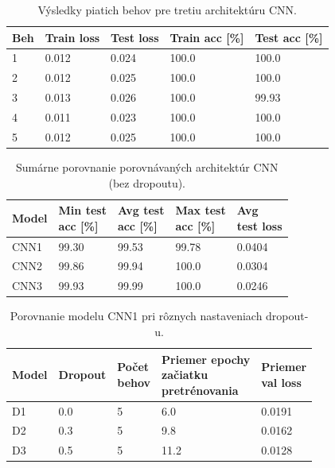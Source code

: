 \documentclass[12pt, a4paper]{article}
\begin{document}
\begin{table}[htbp]
\centering
\caption{Výsledky piatich behov pre tretiu architektúru CNN.}
\label{tab:cnn3_runs}
\begin{tabular}{lllll}
\toprule
Beh & Train loss & Test loss & Train acc [\%] & Test acc [\%] \\
\midrule
1 & 0.012 & 0.024 & 100.0 & 100.0 \\
2 & 0.012 & 0.025 & 100.0 & 100.0 \\
3 & 0.013 & 0.026 & 100.0 & 99.93 \\
4 & 0.011 & 0.023 & 100.0 & 100.0 \\
5 & 0.012 & 0.025 & 100.0 & 100.0 \\
\bottomrule
\end{tabular}
\end{table}

\begin{table}[htbp]
\centering
\caption{Sumárne porovnanie porovnávaných architektúr CNN (bez dropoutu).}
\label{tab:cnn_summary}
\begin{tabular}{lllll}
\toprule
Model & \shortstack{Min test\\acc [\%]} & \shortstack{Avg test\\acc [\%]} & \shortstack{Max test\\acc [\%]} & \shortstack{Avg\\test loss} \\
\midrule
CNN1 & 99.30 & 99.53 & 99.78 & 0.0404 \\
CNN2 & 99.86 & 99.94 & 100.0 & 0.0304 \\
CNN3 & 99.93 & 99.99 & 100.0 & 0.0246 \\
\bottomrule
\end{tabular}
\end{table}

\begin{table}[htbp]
\centering
\caption{Porovnanie modelu CNN1 pri rôznych nastaveniach dropout-u.}
\label{tab:dropout_overfitting}
\begin{tabular}{lllll}
\toprule
Model & Dropout & \shortstack{Počet\\behov} & \shortstack{Priemer epochy\\začiatku\\pretrénovania} & \shortstack{Priemer\\val loss} \\
\midrule
D1 & 0.0 & 5 & 6.0 & 0.0191 \\
D2 & 0.3 & 5 & 9.8 & 0.0162 \\
D3 & 0.5 & 5 & 11.2 & 0.0128 \\
\bottomrule
\end{tabular}
\end{table}
\end{document}
